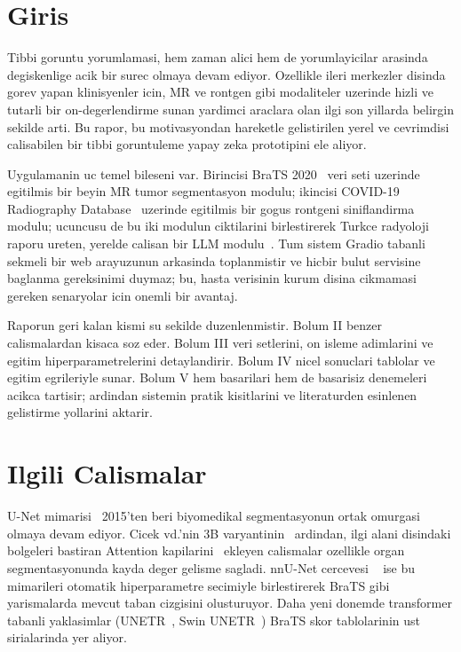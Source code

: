 \documentclass[conference]{IEEEtran}
\begin{document}
\section{Giris}

Tibbi goruntu yorumlamasi, hem zaman alici hem de yorumlayicilar arasinda
degiskenlige acik bir surec olmaya devam ediyor. Ozellikle ileri merkezler
disinda gorev yapan klinisyenler icin, MR ve rontgen gibi modaliteler uzerinde
hizli ve tutarli bir on-degerlendirme sunan yardimci araclara olan ilgi son
yillarda belirgin sekilde arti. Bu rapor, bu motivasyondan hareketle
gelistirilen yerel ve cevrimdisi calisabilen bir tibbi goruntuleme yapay zeka
prototipini ele aliyor.

Uygulamanin uc temel bileseni var. Birincisi BraTS 2020~\cite{menze2015brats}
veri seti uzerinde egitilmis bir beyin MR tumor segmentasyon modulu; ikincisi
COVID-19 Radiography Database~\cite{chowdhury2020covid} uzerinde egitilmis bir
gogus rontgeni siniflandirma modulu; ucuncusu de bu iki modulun ciktilarini
birlestirerek Turkce radyoloji raporu ureten, yerelde calisan bir LLM
modulu~\cite{touvron2023llama}. Tum sistem Gradio tabanli sekmeli bir web
arayuzunun arkasinda toplanmistir ve hicbir bulut servisine baglanma
gereksinimi duymaz; bu, hasta verisinin kurum disina cikmamasi gereken senaryolar
icin onemli bir avantaj.

Raporun geri kalan kismi su sekilde duzenlenmistir. Bolum II benzer
calismalardan kisaca soz eder. Bolum III veri setlerini, on isleme adimlarini
ve egitim hiperparametrelerini detaylandirir. Bolum IV nicel sonuclari tablolar
ve egitim egrileriyle sunar. Bolum V hem basarilari hem de basarisiz denemeleri
acikca tartisir; ardindan sistemin pratik kisitlarini ve literaturden esinlenen
gelistirme yollarini aktarir.

\section{Ilgili Calismalar}

U-Net mimarisi~\cite{ronneberger2015unet} 2015'ten beri biyomedikal
segmentasyonun ortak omurgasi olmaya devam ediyor. Cicek vd.'nin 3B
varyantinin~\cite{cicek20163d} ardindan, ilgi alani disindaki bolgeleri
bastiran Attention kapilarini~\cite{oktay2018attention} ekleyen calismalar
ozellikle organ segmentasyonunda kayda deger gelisme sagladi. nnU-Net cercevesi
~\cite{isensee2021nnunet} ise bu mimarileri otomatik hiperparametre secimiyle
birlestirerek BraTS gibi yarismalarda mevcut taban cizgisini olusturuyor.
Daha yeni donemde transformer tabanli yaklasimlar (UNETR~\cite{hatamizadeh2022unetr},
Swin UNETR~\cite{hatamizadeh2022swinunetr}) BraTS skor tablolarinin ust
sirialarinda yer aliyor.
\end{document}
